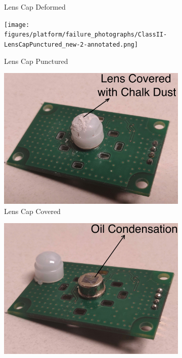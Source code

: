 \begin{figure}
\begin{subfigure}[t]{0.24\textwidth}
		\caption{Lens Cap Deformed}
		\label{fig:failure_photo3}
	\end{subfigure}
	\begin{subfigure}[t]{0.24\textwidth}
		\centering
		\texttt{[image: figures/platform/failure\_photographs/ClassII-LensCapPunctured\_new-2-annotated.png]}
		\caption{Lens Cap Punctured}
		\label{fig:failure_photo4}
	\end{subfigure}
	\hspace{0.1ex}
	\begin{subfigure}[t]{0.24\textwidth}
		\centering
		\includegraphics[width=\textwidth]{figures/platform/failure_photographs/ClassIII-LensCapCovered-annotated-jpg.jpg}
		\caption{\footnotesize Lens Cap Covered}
		\label{fig:failure_photo5}
	\end{subfigure}
	\hspace{0.1ex}%
	\begin{subfigure}[t]{0.24\textwidth}
		\centering
		\includegraphics[width=\textwidth]{figures/platform/failure_photographs/ClassIV-OpticalFilterDamage-annotated-jpg.jpg}

\end{subfigure}
\end{figure}
